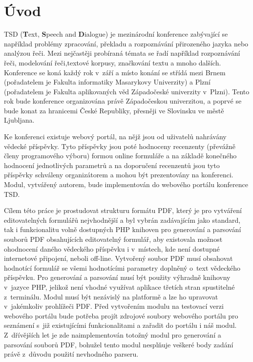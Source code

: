 \chapter{Úvod}
TSD (\textbf{T}ext, \textbf{S}peech and \textbf{D}ialogue) je mezinárodní konference zabývající se například problémy zpracování, překladu a rozpoznávání přirozeného jazyka nebo analýzou řeči. Mezi nejčastěji probíraná témata se řadí například rozpoznávání řeči, modelování řeči,textové korpusy, značkování textu a mnoho dalších. Konference se koná každý rok v~září a místo konání se střídá mezi Brnem (pořadatelem je Fakulta informatiky Masarykovy Univerzity) a Plzní (pořadatelem je Fakulta aplikovaných věd Západočeské univerzity v~Plzni). Tento rok bude konference organizována právě Západočeskou univerzitou, a poprvé se bude konat za hranicemi České Republiky, přesněji ve Slovinsku ve městě Ljubljana.
\par
Ke konferenci existuje webový portál, na nějž jsou od uživatelů nahrávány vědecké příspěvky. Tyto příspěvky jsou poté hodnoceny recenzenty (převážně členy programového výboru) formou online formuláře a na základě konečného hodnocení jednotlivých parametrů a na doporučení recenzentů jsou tyto příspěvky schváleny organizátorem a mohou být prezentovány na konferenci. Modul, vytvářený autorem, bude implementován do webového portálu konference TSD.
\par
Cílem této práce je prostudovat strukturu formátu PDF, který je pro vytváření editovatelných formulářů nejvhodnější a byl vybrán zadávajícím jako standard, tak i funkcionalitu volně dostupných PHP knihoven pro generování a parsování souborů PDF obsahujících editovatelný formulář, aby existovala možnost ohodnocení daného vědeckého příspěvku i v~místech, kde není dostupné internetové připojení, neboli off-line. Vytvořený soubor PDF musí obsahovat hodnotící formulář se všemi hodnotícími parametry doplněný o~text vědeckého příspěvku. Pro generování a parsování musí být použity výhradně knihovny v~jazyce PHP, jelikož není vhodné využívat aplikace třetích stran spustitelné z~terminálu. Modul musí být nezávislý na platformě a lze ho upravovat v~jakémkoliv prohlížeči PDF. Před vytvořením modulu na testovací verzi webového portálu bude potřeba projít zdrojové soubory webového portálu pro seznámení s~již existujícími funkcionalitami a zařadit do portálu i náš modul. Z~dřívějších let je zde naimplementován totožný modul pro generování a parsování souborů PDF, bohužel tento modul nesplňuje veškeré body zadání právě z~důvodu použití nevhodného parseru.
 